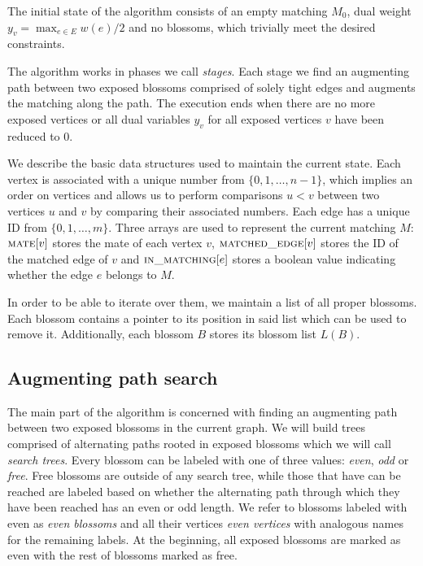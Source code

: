 The initial state of the algorithm consists of an empty matching $M_0$, dual weight $y_v = \max_{e \in E} w(e)/2$ and no blossoms, which trivially meet the desired constraints.

The algorithm works in phases we call \emph{stages}. Each stage we find an augmenting path between two exposed blossoms comprised of solely tight edges and augments the matching along the path. The execution ends when there are no more exposed vertices or all dual variables $y_v$ for all exposed vertices $v$ have been reduced to $0$.

We describe the basic data structures used to maintain the current state. Each vertex is associated with a unique number from $\{0, 1, \dots, n-1\}$, which implies an order on vertices and allows us to perform comparisons $u < v$ between two vertices $u$ and $v$ by comparing their associated numbers. Each edge has a unique ID from $\{0, 1, \dots, m\}$. Three arrays are used to represent the current matching $M$: $\textsc{mate}[v]$ stores the mate of each vertex $v$, $\textsc{matched\_edge}[v]$ stores the ID of the matched edge of $v$ and $\textsc{in\_matching}[e]$ stores a boolean value indicating whether the edge $e$ belongs to $M$. 

In order to be able to iterate over them, we maintain a list of all proper blossoms. Each blossom contains a pointer to its position in said list which can be used to remove it. Additionally, each blossom $B$ stores its blossom list $L(B)$.

\subsection{Augmenting path search}

The main part of the algorithm is concerned with finding an augmenting path between two exposed blossoms in the current graph. We will build trees comprised of alternating paths rooted in exposed blossoms which we will call \emph{search trees}. Every blossom can be labeled with one of three values: \emph{even}, \emph{odd} or \emph{free}. Free blossoms are outside of any search tree, while those that have can be reached are labeled based on whether the alternating path through which they have been reached has an even or odd length. We refer to blossoms labeled with even as \emph{even blossoms} and all their vertices \emph{even vertices} with analogous names for the remaining labels. At the beginning, all exposed blossoms are marked as even with the rest of blossoms marked as free.

